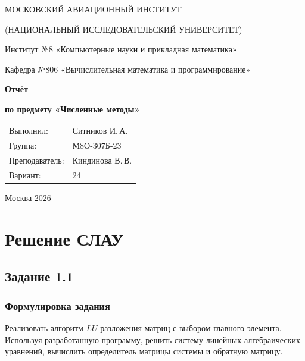 \documentclass[12pt,a4paper]{article}
\begin{document}
\hypersetup{pageanchor=false}
\begin{titlepage}
    \centering
    {\large МОСКОВСКИЙ АВИАЦИОННЫЙ ИНСТИТУТ\par}
    \vspace{3mm}
    {\large (НАЦИОНАЛЬНЫЙ ИССЛЕДОВАТЕЛЬСКИЙ УНИВЕРСИТЕТ)\par}
    \vspace{8mm}
    {\normalsize Институт №8 «Компьютерные науки и прикладная математика»\par}
    {\normalsize Кафедра №806 «Вычислительная математика и программирование»\par}

    \vfill
    {\Large\bfseries Отчёт\par}
    \vspace{2mm}
    {\large\bfseries по предмету «Численные методы»\par}

    \vfill
    \begin{flushright}
        \begin{tabular}{@{}ll@{}}
            Выполнил: & Ситников И.\,А.\\
            Группа: & М8О-307Б-23\\
            Преподаватель: & Киндинова В.\,В.\\
            Вариант: & 24
        \end{tabular}
    \end{flushright}

    \vfill
    {\large Москва 2026\par}
\end{titlepage}
\hypersetup{pageanchor=true}
\setcounter{page}{2}

\tableofcontents
\clearpage

\section{Решение СЛАУ}

\subsection{Задание 1.1}

\subsubsection{Формулировка задания}
Реализовать алгоритм $LU$-разложения матриц с выбором главного элемента.
Используя разработанную программу, решить систему линейных алгебраических
уравнений, вычислить определитель матрицы системы и обратную матрицу.
\end{document}
